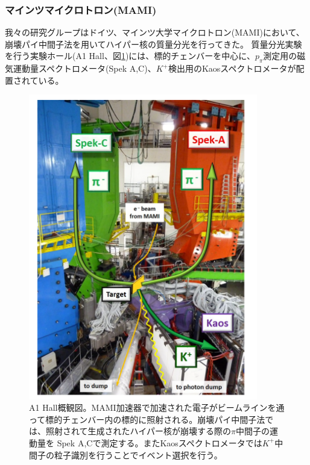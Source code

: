 \documentclass[a4paper,11pt,uplatex]{jsbook}
\begin{document}
\subsubsection{マインツマイクロトロン(MAMI)}
我々の研究グループはドイツ、マインツ大学マイクロトロン(MAMI)において、崩壊パイ中間子法を用いてハイパー核の質量分光を行ってきた。
質量分光実験を行う実験ホール(A1 Hall、図\ref{exp_hall})には、標的チェンバーを中心に、$p_\pi$測定用の磁気運動量スペクトロメータ(Spek A,C)、$K^+$検出用のKaosスペクトロメータが配置されている。
\begin{figure}[h]
  \centering
  \includegraphics[width=10cm]{image/1-HallA.png}
  \caption[MAMI実験ホール]{A1 Hall概観図。MAMI加速器で加速された電子がビームラインを通って標的チェンバー内の標的に照射される。崩壊パイ中間子法では、照射されて生成されたハイパー核が崩壊する際の$\pi$中間子の運動量を
  Spek A,Cで測定する。またKaosスペクトロメータでは$K^+$中間子の粒子識別を行うことでイベント選択を行う。\cite{esserObservation4Hyperhydrogen2015}}
  \label{exp_hall}
\end{figure}
\end{document}
